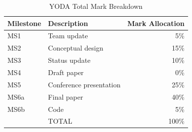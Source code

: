 \begin{table}[H]
\centering
\caption{YODA Total Mark Breakdown}
\label{tbl:YODAMarkTotal}
\begin{tabular}{|l|l|r|}
\hline
\textbf{Milestone} & \textbf{Description} & \multicolumn{1}{l|}{\textbf{Mark Allocation}} \\ \hline
MS1 & Team update & 5\% \\ \hline
MS2 & Conceptual design & 15\% \\ \hline
MS3 & Status update & 10\% \\ \hline
MS4 & Draft paper & 0\% \\ \hline
MS5 & Conference presentation & 25\% \\ \hline
MS6a & Final paper & 40\% \\ \hline
MS6b & Code & 5\% \\ \hline
 & TOTAL & 100\% \\ \hline
\end{tabular}
\end{table}